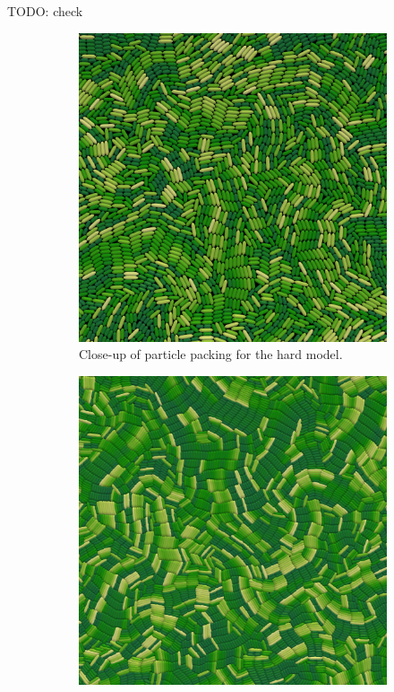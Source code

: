 \documentclass[conference]{IEEEtran}
\begin{document}
TODO: check~\cite{Warren2019}

\begin{figure}[H]
    \centering
    \begin{subfigure}[b]{0.49\columnwidth}
        \centering
        \includegraphics[width=\linewidth]{figures/comparison_plots/density_hard.jpeg}
        \caption{Close-up of particle packing for the hard model.}
        \label{fig:packing_hard}
    \end{subfigure}
    \begin{subfigure}[b]{0.49\columnwidth}
        \centering
        \includegraphics[width=\linewidth]{figures/comparison_plots/density_soft.jpeg}

\end{subfigure}
\end{figure}
\end{document}
